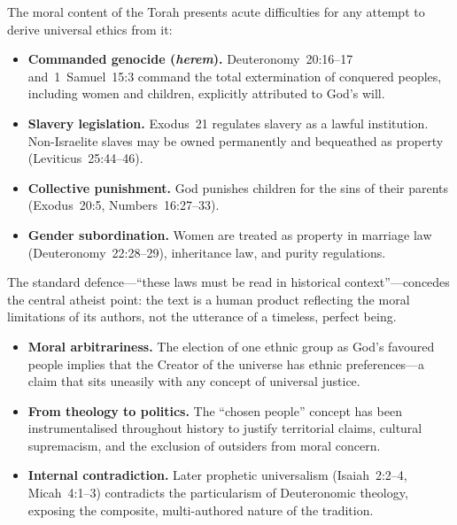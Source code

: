 \documentclass[11pt,twoside]{article}
\begin{document}
\begin{scheda}

The moral content of the Torah presents acute difficulties for
any attempt to derive universal ethics from it:

\begin{itemize}
  \item \textbf{Commanded genocide (\emph{herem}).}
    Deuteronomy~20:16--17 and~1~Samuel~15:3 command the total extermination
    of conquered peoples, including women and children, explicitly attributed
    to God's will.
  \item \textbf{Slavery legislation.}
    Exodus~21 regulates slavery as a lawful institution.  Non-Israelite
    slaves may be owned permanently and bequeathed as property
    (Leviticus~25:44--46).
  \item \textbf{Collective punishment.}
    God punishes children for the sins of their parents
    (Exodus~20:5, Numbers~16:27--33).
  \item \textbf{Gender subordination.}
    Women are treated as property in marriage law (Deuteronomy~22:28--29),
    inheritance law, and purity regulations.
\end{itemize}

\begin{notabox}
The standard defence---``these laws must be read in historical
context''---concedes the central atheist point: the text is a human product
reflecting the moral limitations of its authors, not the utterance of a
timeless, perfect being.
\end{notabox}
\end{scheda}

\begin{scheda}

\begin{itemize}
  \item \textbf{Moral arbitrariness.}
    The election of one ethnic group as God's
    favoured people implies that the Creator of the universe has ethnic
    preferences---a claim that sits uneasily with any concept of universal
    justice.
  \item \textbf{From theology to politics.}
    The ``chosen people'' concept has been instrumentalised throughout
    history to justify territorial claims, cultural supremacism, and the
    exclusion of outsiders from moral concern.
  \item \textbf{Internal contradiction.}
    Later prophetic universalism (Isaiah~2:2--4,
    Micah~4:1--3) contradicts the particularism of Deuteronomic theology,
    exposing the composite, multi-authored nature of the tradition.
\end{itemize}
\end{scheda}
\end{document}
